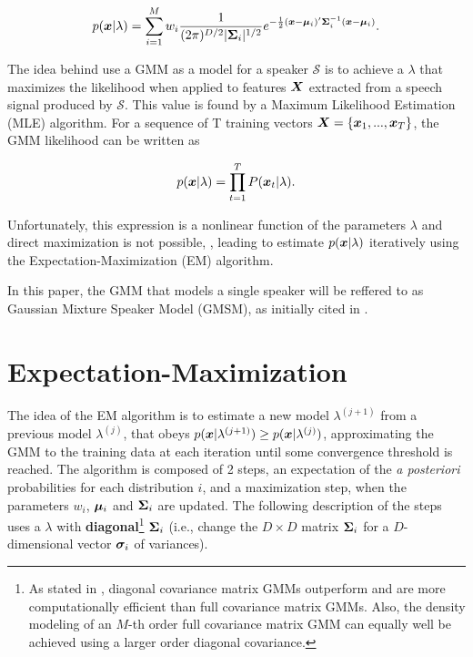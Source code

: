 \begin{equation}
    \postpdf{\dvec{x}}{\lambda} = \dgaussianmixture.
    \label{eq:likelihood_gmm}
\end{equation}

The idea behind use a GMM as a model for a speaker $\mathcal{S}$ is to achieve a $\lambda$ that maximizes the likelihood when applied to features $\boldsymbol{X}$ extracted from a speech signal produced by $\mathcal{S}$. This value is found by a Maximum Likelihood Estimation (MLE) algorithm. For a sequence of T training vectors $\boldsymbol{X} = \{\boldsymbol{x}_1, ..., \boldsymbol{x}_T\}$, the GMM likelihood can be written as

\begin{equation}
    \postpdf{\dvec{x}}{\lambda} = \prod_{t=1}^T \postprob{\dvec{x}_t}{\lambda}.
    \label{eq:likelihood_gmm_mle}
\end{equation}

\noindent Unfortunately, this expression is a nonlinear function of the parameters $\lambda$ and direct maximization is not possible, , leading to estimate $p(\boldsymbol{x}|\lambda)$ iteratively using the Expectation-Maximization (EM) algorithm.

In this paper, the GMM that models a single speaker will be reffered to as Gaussian Mixture Speaker Model (GMSM), as initially cited in .

\section{Expectation-Maximization}
\label{sec:em}

The idea of the EM algorithm is to estimate a new model $\lambda^{(j+1)}$ from a previous model $\lambda^{(j)}$, that obeys $p(\boldsymbol{x}|\lambda^{(j+1)}) \geq p(\boldsymbol{x}|\lambda^{(j)})$, approximating the GMM to the training data at each iteration until some convergence threshold is reached. The algorithm is composed of 2 steps, an expectation of the \emph{a posteriori} probabilities for each distribution $i$, and a maximization step, when the parameters $w_i$, $\boldsymbol{\mu}_i$ and $\boldsymbol{\Sigma}_i$ are updated. The following description of the steps uses a $\lambda$ with \textbf{diagonal}\footnote{As stated in , diagonal covariance matrix GMMs outperform and are more computationally efficient than full covariance matrix GMMs. Also, the density modeling of an $M$-th order full covariance matrix GMM can equally well be achieved using a larger order diagonal covariance.} $\boldsymbol{\Sigma}_i$ (i.e., change the $D \times D$ matrix $\boldsymbol{\Sigma}_i$ for a $D$-dimensional vector $\boldsymbol{\sigma}_i$ of variances).

